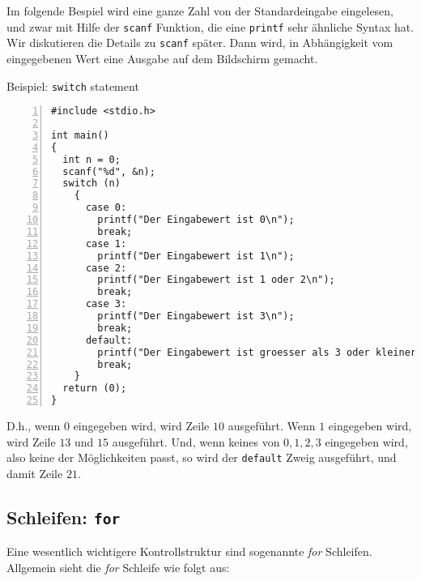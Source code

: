 Im folgende Bespiel wird eine ganze Zahl von der Standardeingabe eingelesen, und zwar mit Hilfe der \verb|scanf| Funktion, die eine \verb|printf| sehr ähnliche Syntax hat.
Wir diskutieren die Details zu \verb|scanf| später.
Dann wird, in Abhängigkeit vom eingegebenen Wert eine Ausgabe auf dem Bildschirm gemacht.
\begin{myexampleprogram}{Beispiel: \texttt{switch} statement}
\begin{lstlisting}[numbers=left]
#include <stdio.h>

int main()
{
  int n = 0;
  scanf("%d", &n);
  switch (n)
    {
      case 0:
        printf("Der Eingabewert ist 0\n");
        break;
      case 1:
        printf("Der Eingabewert ist 1\n");
      case 2:
        printf("Der Eingabewert ist 1 oder 2\n");
        break;
      case 3:
        printf("Der Eingabewert ist 3\n");
        break;
      default:
        printf("Der Eingabewert ist groesser als 3 oder kleiner als 0\n");
        break;
    }
  return (0);
}
\end{lstlisting}
\end{myexampleprogram}
D.h., wenn $0$ eingegeben wird, wird Zeile $10$ ausgeführt.
Wenn $1$ eingegeben wird, wird Zeile $13$ und $15$ ausgeführt.
Und, wenn keines von $0,1,2,3$ eingegeben wird, also keine der Möglichkeiten passt, so wird der \verb|default| Zweig ausgeführt, und damit Zeile $21$.

\subsection{Schleifen: \texttt{for}}

Eine wesentlich wichtigere Kontrollstruktur sind sogenannte \emph{for} Schleifen.
Allgemein sieht die \emph{for} Schleife wie folgt aus:

